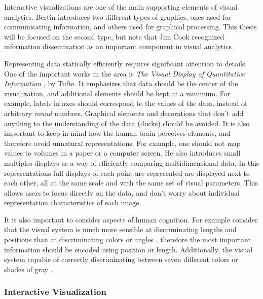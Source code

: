 Interactive visualizations are one of the main supporting elements of visual analytics. Bertin 
\autocite{bertin_graphics_1981} introduces two different types of graphics, ones used for communicating information, and others used for graphical processing. This thesis will be focused on the second type, but note that Jim Cook recognized information dissemination as an important component in visual analytics \autocite{cook_illuminating_2005}.


Representing data statically efficiently requires significant attention to details. One of the important works in the area is \emph{The Visual Display of Quantitative Information} \autocite{tufte_visual_1983} , by Tufte. It emphasizes that data should be the center of the visualization, and additional elements should be kept at a minimum. For example, labels in axes should correspond to the values of the data, instead of arbitrary \emph{round} numbers. Graphical elements and decorations that don't add anything to the understanding of the data (ducks) should be avoided. It is also important to keep in mind how the human brain perceives elements, and therefore avoid unnatural representations. For example, one should not map values to volumes in a paper or a computer screen. He also introduces small multiples displays as a way of efficiently comparing multidimensional data. In this representations full displays of each point are represented are displayed next to each other, all at the same scale and with the same set of visual parameters. This allows users to focus directly on the data, and don't worry about individual representation characteristics of each image.

It is also important to consider aspects of human cognition. For example consider that the visual system is much more sensible at discriminating lengths and positions than at discriminating colors or angles \autocite{ware_information_2004}, therefore the most important information should be encoded using position or length. Additionally, the visual system capable of correctly discriminating between seven different colors or shades of gray \autocite{miller_magical_1956}.




\subsubsection{Interactive Visualization}

